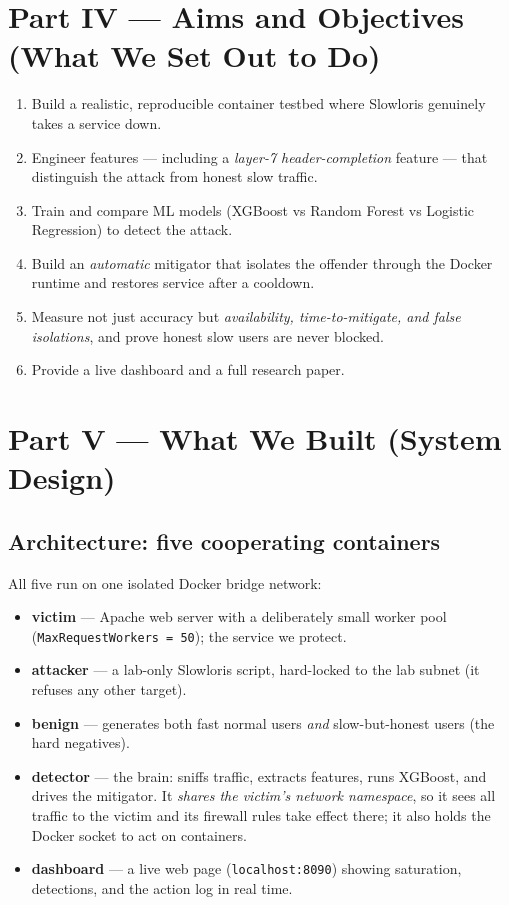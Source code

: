 \documentclass[11pt,a4paper]{article}
\begin{document}
\section{Part IV --- Aims and Objectives (What We Set Out to Do)}
\begin{enumerate}
  \item Build a realistic, reproducible container testbed where Slowloris
  genuinely takes a service down.
  \item Engineer features --- including a \emph{layer-7 header-completion}
  feature --- that distinguish the attack from honest slow traffic.
  \item Train and compare ML models (XGBoost vs Random Forest vs Logistic
  Regression) to detect the attack.
  \item Build an \emph{automatic} mitigator that isolates the offender through the
  Docker runtime and restores service after a cooldown.
  \item Measure not just accuracy but \emph{availability, time-to-mitigate, and
  false isolations}, and prove honest slow users are never blocked.
  \item Provide a live dashboard and a full research paper.
\end{enumerate}

\section{Part V --- What We Built (System Design)}

\subsection{Architecture: five cooperating containers}
All five run on one isolated Docker bridge network:
\begin{itemize}
  \item \textbf{victim} --- Apache web server with a deliberately small worker pool
  (\texttt{MaxRequestWorkers = 50}); the service we protect.
  \item \textbf{attacker} --- a lab-only Slowloris script, hard-locked to the lab
  subnet (it refuses any other target).
  \item \textbf{benign} --- generates both fast normal users \emph{and}
  slow-but-honest users (the hard negatives).
  \item \textbf{detector} --- the brain: sniffs traffic, extracts features, runs
  XGBoost, and drives the mitigator. It \emph{shares the victim's network
  namespace}, so it sees all traffic to the victim and its firewall rules take
  effect there; it also holds the Docker socket to act on containers.
  \item \textbf{dashboard} --- a live web page (\texttt{localhost:8090}) showing
  saturation, detections, and the action log in real time.
\end{itemize}
\end{document}
